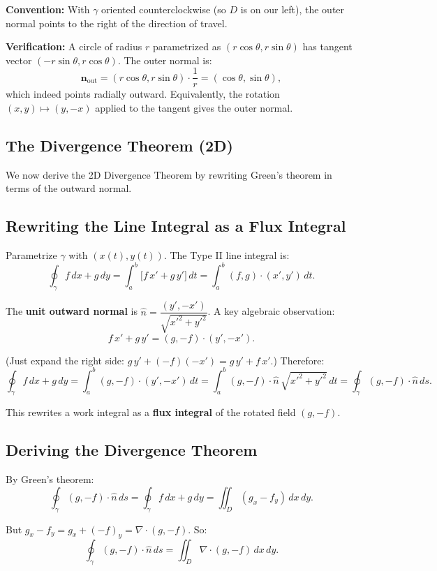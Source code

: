 \documentclass[11pt]{report}
\begin{document}
\textbf{Convention:} With $\gamma$ oriented counterclockwise (so $D$ is on our left), the outer normal points to the right of the direction of travel.

\textbf{Verification:} A circle of radius $r$ parametrized as $(r\cos\theta, r\sin\theta)$ has tangent vector $(-r\sin\theta, r\cos\theta)$. The outer normal is:
\[
\mathbf{n}_{\text{out}} = (r\cos\theta, r\sin\theta) \cdot \frac{1}{r} = (\cos\theta, \sin\theta),
\]
which indeed points radially outward. Equivalently, the rotation $(x, y) \mapsto (y, -x)$ applied to the tangent gives the outer normal.

\subsection{The Divergence Theorem (2D)}

We now derive the 2D Divergence Theorem by rewriting Green's theorem in terms of the outward normal.

\subsection*{Rewriting the Line Integral as a Flux Integral}

Parametrize $\gamma$ with $(x(t), y(t))$. The Type II line integral is:
\[
\oint_\gamma f \, dx + g \, dy = \int_a^b \big[ f \, x' + g \, y' \big] \, dt = \int_a^b (f, g) \cdot (x', y') \, dt.
\]

The \textbf{unit outward normal} is $\hat{n} = \dfrac{(y', -x')}{\sqrt{x'^2 + y'^2}}$. A key algebraic observation:
\[
f \, x' + g \, y' = (g, -f) \cdot (y', -x').
\]

(Just expand the right side: $g \, y' + (-f)(-x') = g \, y' + f \, x'$.) Therefore:
\[
\oint_\gamma f \, dx + g \, dy = \int_a^b (g, -f) \cdot (y', -x') \, dt = \int_a^b (g, -f) \cdot \hat{n} \, \sqrt{x'^2 + y'^2} \, dt = \oint_\gamma (g, -f) \cdot \hat{n} \, ds.
\]

This rewrites a work integral as a \textbf{flux integral} of the rotated field $(g, -f)$.

\subsection*{Deriving the Divergence Theorem}

By Green's theorem:
\[
\oint_\gamma (g, -f) \cdot \hat{n} \, ds = \oint_\gamma f \, dx + g \, dy = \iint_D (g_x - f_y) \, dx \, dy.
\]

But $g_x - f_y = g_x + (-f)_y = \nabla \cdot (g, -f)$. So:
\[
\oint_\gamma (g, -f) \cdot \hat{n} \, ds = \iint_D \nabla \cdot (g, -f) \, dx \, dy.
\]
\end{document}
